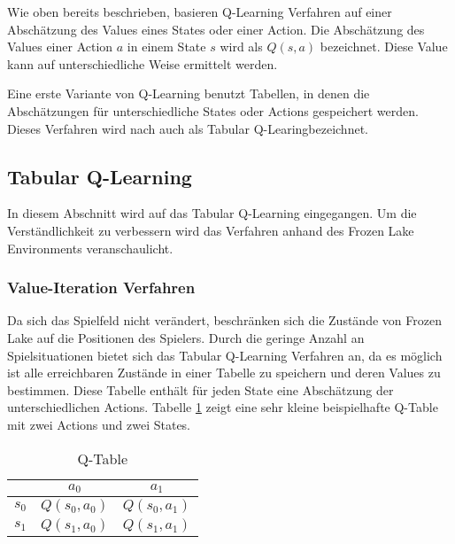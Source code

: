 \documentclass[11pt]{scrartcl}
\begin{document}
Wie oben bereits beschrieben, basieren Q-Learning Verfahren auf einer Abschätzung des
Values eines States oder einer Action. Die Abschätzung des Values einer Action $a$ in
einem State $s$ wird als $Q(s, a)$ bezeichnet. Diese Value kann auf unterschiedliche
Weise ermittelt werden.

Eine erste Variante von Q-Learning benutzt Tabellen, in denen die Abschätzungen
für unterschiedliche States oder Actions gespeichert werden. Dieses Verfahren wird nach
\cite[~S.193]{L2018} auch als \grqq Tabular Q-Learing\grqq bezeichnet.


\subsection{Tabular Q-Learning}
\label{sec:tab-q-learning}
In diesem Abschnitt wird auf das Tabular Q-Learning eingegangen. Um die
Ver\-ständ\-lich\-keit zu verbessern wird das Verfahren anhand des Frozen Lake
Environments veranschaulicht.


\subsubsection{Value-Iteration Verfahren}
Da sich das Spielfeld nicht verändert, beschränken sich die Zustände von Frozen Lake auf
die Positionen des Spielers. Durch die geringe Anzahl an Spielsituationen bietet sich das
Tabular Q-Learning Verfahren an, da es möglich ist alle erreichbaren Zustände in einer
Tabelle zu speichern und deren Values zu bestimmen. Diese Tabelle enthält für jeden State
eine Abschätzung der unterschiedlichen Actions. Tabelle \ref{tab:q_table} zeigt eine
sehr kleine beispielhafte Q-Table mit zwei Actions und zwei States.

\begin{table}[ht]
  \begin{center}
    \begin{tabular}{c | c | c}
       & $a_0$ & $a_1$ \\
      \hline
      $s_0$ & $Q(s_0, a_0)$ &$ Q(s_0, a_1)$ \\
      \hline
      $s_1$ & $Q(s_1, a_0)$ & $Q(s_1, a_1)$ \\
    \end{tabular}

    \caption[Q-Table]{Q-Table}
    \label{tab:q_table}
  \end{center}
\end{table}
\end{document}
